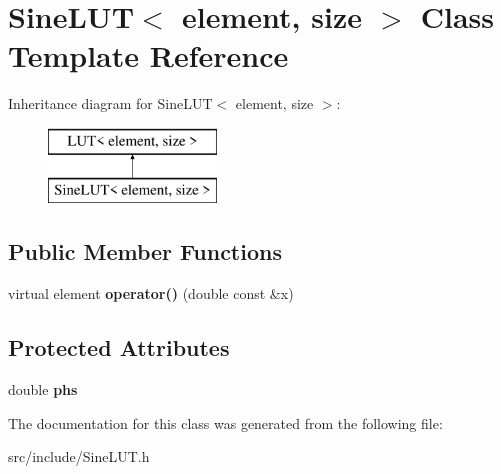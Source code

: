 \hypertarget{class_sine_l_u_t}{\section{Sine\+L\+U\+T$<$ element, size $>$ Class Template Reference}
\label{class_sine_l_u_t}
}
Inheritance diagram for Sine\+L\+U\+T$<$ element, size $>$\+:\begin{figure}[H]
\begin{center}
\leavevmode
\includegraphics[height=2.000000cm]{class_sine_l_u_t}
\end{center}
\end{figure}
\subsection*{Public Member Functions}
\begin{DoxyCompactItemize}
\item 
\hypertarget{class_sine_l_u_t_a8864b8e42380544803f42fdd01b80aea}{virtual element {\bfseries operator()} (double const \&x)}\label{class_sine_l_u_t_a8864b8e42380544803f42fdd01b80aea}

\end{DoxyCompactItemize}
\subsection*{Protected Attributes}
\begin{DoxyCompactItemize}
\item 
\hypertarget{class_sine_l_u_t_aaa76f2c86d7844c6c93f9bac88b54245}{double {\bfseries phs}}\label{class_sine_l_u_t_aaa76f2c86d7844c6c93f9bac88b54245}

\end{DoxyCompactItemize}


The documentation for this class was generated from the following file\+:\begin{DoxyCompactItemize}
\item 
src/include/Sine\+L\+U\+T.\+h\end{DoxyCompactItemize}
